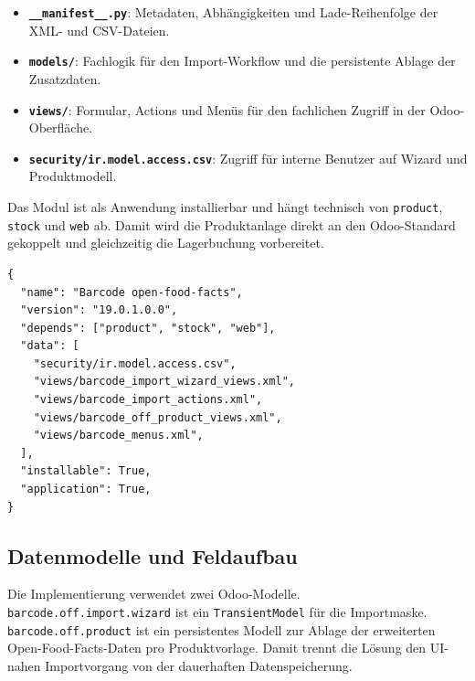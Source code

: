 \documentclass[12pt,a4paper]{article}
\begin{document}
\begin{itemize}
  \item \textbf{\texttt{\_\_manifest\_\_.py}}: Metadaten, Abhängigkeiten und Lade-Reihenfolge der XML- und CSV-Dateien.
  \item \textbf{\texttt{models/}}: Fachlogik für den Import-Workflow und die persistente Ablage der Zusatzdaten.
  \item \textbf{\texttt{views/}}: Formular, Actions und Menüs für den fachlichen Zugriff in der Odoo-Oberfläche.
  \item \textbf{\texttt{security/ir.model.access.csv}}: Zugriff für interne Benutzer auf Wizard und Produktmodell.
\end{itemize}

Das Modul ist als Anwendung installierbar und hängt technisch von \texttt{product}, \texttt{stock} und \texttt{web} ab. Damit wird die Produktanlage direkt an den Odoo-Standard gekoppelt und gleichzeitig die Lagerbuchung vorbereitet.

\begin{lstlisting}[caption={Auszug aus \texttt{\_\_manifest\_\_.py}}, label={lst:off-manifest}]
{
  "name": "Barcode open-food-facts",
  "version": "19.0.1.0.0",
  "depends": ["product", "stock", "web"],
  "data": [
    "security/ir.model.access.csv",
    "views/barcode_import_wizard_views.xml",
    "views/barcode_import_actions.xml",
    "views/barcode_off_product_views.xml",
    "views/barcode_menus.xml",
  ],
  "installable": True,
  "application": True,
}
\end{lstlisting}

\subsection{Datenmodelle und Feldaufbau}

Die Implementierung verwendet zwei Odoo-Modelle. \texttt{barcode.off.import.wizard} ist ein \texttt{TransientModel} für die Importmaske. \texttt{barcode.off.product} ist ein persistentes Modell zur Ablage der erweiterten Open-Food-Facts-Daten pro Produktvorlage. Damit trennt die Lösung den UI-nahen Importvorgang von der dauerhaften Datenspeicherung.
\end{document}
